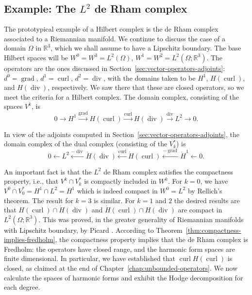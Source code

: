 \subsection{{Example: The $L^2$ de Rham complex}}\label{sec:l2-de-rham-complex}

{The prototypical example of a Hilbert complex is the de Rham complex associated to a Riemannian manifold. We continue to discuss the case of a domain $\Omega$ in $\mathbb R^3$, which we shall assume to have a Lipschitz boundary. The base Hilbert spaces will be $W^0=W^3=L^2(\Omega)$, $W^1=W^2=L^2(\Omega;\mathbb R^3)$. The operators are the ones discussed in Section~\ref{sec:vector-operators-adjoints}: $d^0=\operatorname{grad}$, $d^1=\operatorname{curl}$, $d^2=\operatorname{div}$, with the domains taken to be $H^1$, $H(\operatorname{curl})$, and $H(\operatorname{div})$, respectively. We saw there that these are closed operators, so we meet the criteria for a Hilbert complex. The domain complex, consisting of the spaces $V^k$, is}
\begin{equation}\label{eq:l2-de-rham-domain-complex}
0\to H^1\xrightarrow{\operatorname{grad}}H(\operatorname{curl})\xrightarrow{\operatorname{curl}}H(\operatorname{div})\xrightarrow{\operatorname{div}}L^2\to0.
\end{equation}

{In view of the adjoints computed in Section~\ref{sec:vector-operators-adjoints}, the domain complex of the dual complex (consisting of the $V_k^*$) is}
\begin{equation}\label{eq:l2-dual-domain-complex}
0\leftarrow L^2\xleftarrow{-\operatorname{div}}\mathring H(\operatorname{div})\xleftarrow{\operatorname{curl}}\mathring H(\operatorname{curl})\xleftarrow{-\operatorname{grad}}\mathring H^1\leftarrow0.
\end{equation}

{An important fact is that the $L^2$ de Rham complex satisfies the compactness property, i.e., that $V^k\cap V_k^*$ is compactly included in $W^k$. For $k=0$, we have $V^0\cap V_0^*=H^1\cap L^2=H^1$ which is indeed compact in $W^0=L^2$ by Rellich's theorem. The result for $k=3$ is similar. For $k=1$ and $2$ the desired results are that $H(\operatorname{curl})\cap\mathring H(\operatorname{div})$ and $\mathring H(\operatorname{curl})\cap H(\operatorname{div})$ are compact in $L^2(\Omega;\mathbb R^3)$. This was proved, in the greater generality of Riemannian manifolds with Lipschitz boundary, by Picard . According to Theorem~\ref{thm:compactness-implies-fredholm}, the compactness property implies that the de Rham complex is Fredholm: the operators have closed range, and the harmonic form spaces are finite dimensional. In particular, we have established that $\operatorname{curl}H(\operatorname{curl})$ is closed, as claimed at the end of Chapter~\ref{chap:unbounded-operators}. We now calculate the spaces of harmonic forms and exhibit the Hodge decomposition for each degree.}

